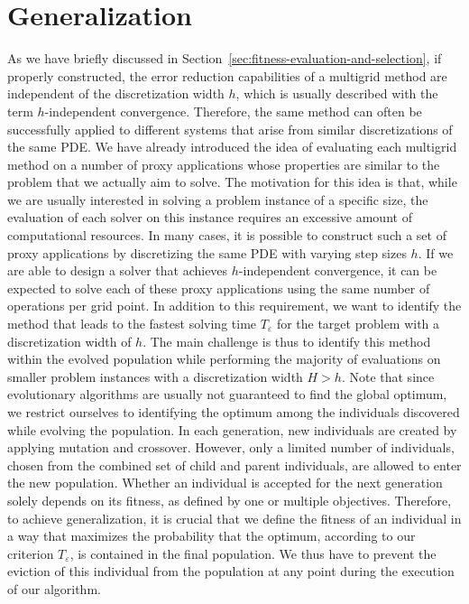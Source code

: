 \section{Generalization}
\label{sec:generalization}
As we have briefly discussed in Section~\ref{sec:fitness-evaluation-and-selection}, if properly constructed, the error reduction capabilities of a multigrid method are independent of the discretization width $h$, which is usually described with the term $h$-independent convergence.
Therefore, the same method can often be successfully applied to different systems that arise from similar discretizations of the same PDE.
We have already introduced the idea of evaluating each multigrid method on a number of proxy applications whose properties are similar to the problem that we actually aim to solve.
The motivation for this idea is that, while we are usually interested in solving a problem instance of a specific size, the evaluation of each solver on this instance requires an excessive amount of computational resources.
In many cases, it is possible to construct such a set of proxy applications by discretizing the same PDE with varying step sizes $h$.
If we are able to design a solver that achieves $h$-independent convergence, it can be expected to solve each of these proxy applications using the same number of operations per grid point.
In addition to this requirement, we want to identify the method that leads to the fastest solving time $T_\varepsilon$ for the target problem with a discretization width of $h$.
The main challenge is thus to identify this method within the evolved population while performing the majority of evaluations on smaller problem instances with a discretization width $H > h$.
Note that since evolutionary algorithms are usually not guaranteed to find the global optimum, we restrict ourselves to identifying the optimum among the individuals discovered while evolving the population.
In each generation, new individuals are created by applying mutation and crossover.
However, only a limited number of individuals, chosen from the combined set of child and parent individuals, are allowed to enter the new population.
Whether an individual is accepted for the next generation solely depends on its fitness, as defined by one or multiple objectives.
Therefore, to achieve generalization, it is crucial that we define the fitness of an individual in a way that maximizes the probability that the optimum, according to our criterion $T_{\varepsilon}$, is contained in the final population.
We thus have to prevent the eviction of this individual from the population at any point during the execution of our algorithm.

